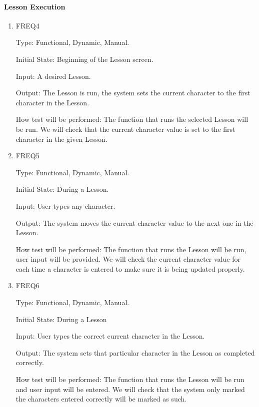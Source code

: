 \documentclass[12pt, titlepage]{article}
\begin{document}
\paragraph{Lesson Execution}
\begin{enumerate}
    					
\item{FREQ4\\}

Type: Functional, Dynamic, Manual.
					
Initial State: Beginning of the Lesson screen.
					
Input: A desired Lesson.
					
Output: The Lesson is run, the system sets the current character to the first character in the Lesson.
					
How test will be performed: The function that runs the selected Lesson will be run. We will check that the current character value is set to the first character in the given Lesson.

					
\item{FREQ5\\}

Type: Functional, Dynamic, Manual.
					
Initial State: During a Lesson.
					
Input: User types any character.
					
Output: The system moves the current character value to the next one in the Lesson.
					
How test will be performed: The function that runs the Lesson will be run, user input will be provided. We will check the current character value for each time a character is entered to make sure it is being updated properly.

					
\item{FREQ6\\}

Type: Functional, Dynamic, Manual.
					
Initial State: During a Lesson
					
Input: User types the correct current character in the Lesson.
					
Output: The system sets that particular character in the Lesson as completed correctly.
					
How test will be performed: The function that runs the Lesson will be run and user input will be entered. We will check that the system only marked the characters entered correctly will be marked as such.


\end{enumerate}
\end{document}
